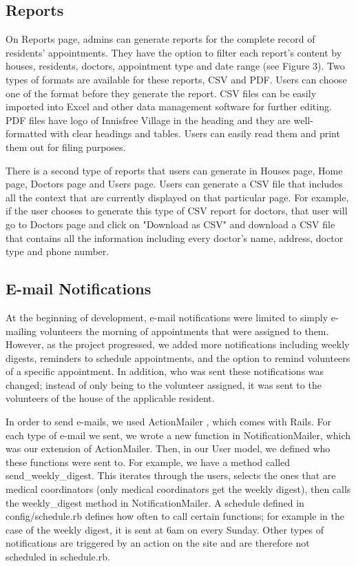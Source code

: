 \documentclass{sig-alternate}
\begin{document}
\subsection{Reports}
On Reports page, admins can generate reports for the complete record of residents' appointments. They have the option to filter each report's content by houses, residents, doctors, appointment type and date range (see Figure 3). Two types of formats are available for these reports, CSV and PDF. Users can choose one of the format before they generate the report. CSV files can be easily imported into Excel and other data management software for further editing. PDF files have logo of Innisfree Village in the heading and they are well-formatted with clear headings and tables. Users can easily read them and print them out for filing purposes. 

There is a second type of reports that users can generate in Houses page, Home page, Doctors page and Users page. Users can generate a CSV file that includes all the context that are currently displayed on that particular page. For example, if the user chooses to generate this type of CSV report for doctors, that user will go to Doctors page and click on "Download as CSV" and download a CSV file that contains all the information including every doctor's name, address, doctor type and phone number. 

\subsection{E-mail Notifications}
At the beginning of development, e-mail notifications were limited to simply e-mailing volunteers the morning of appointments that were assigned to them.  However, as the project progressed, we added more notifications including weekly digests, reminders to schedule appointments, and the option to remind volunteers of a specific appointment.  In addition, who was sent these notifications was changed; instead of only being to the volunteer assigned, it was sent to the volunteers of the house of the applicable resident.

In order to send e-mails, we used ActionMailer \cite{actionmailer}, which comes with Rails.  For each type of e-mail we sent, we wrote a new function in NotificationMailer, which was our extension of ActionMailer.  Then, in our User model, we defined who these functions were sent to.  For example, we have a method called send\_weekly\_digest.   This iterates through the users, selects the ones that are medical coordinators (only medical coordinators get the weekly digest), then calls the weekly\_digest method in NotificationMailer.  A schedule defined in config/schedule.rb defines how often to call certain functions; for example in the case of the weekly digest, it is sent at 6am on every Sunday.  Other types of notifications are triggered by an action on the site and are therefore not scheduled in schedule.rb. 
\end{document}
